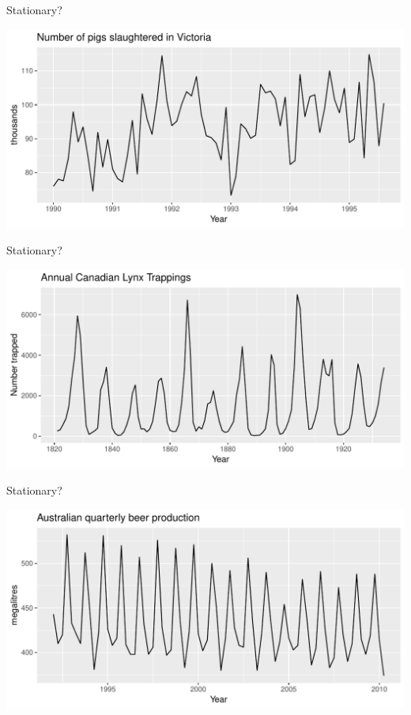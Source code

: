 \documentclass[14pt,ignorenonframetext,]{beamer}
\begin{document}
\begin{frame}{Stationary?}

\includegraphics{week_5_arima_files/figure-beamer/unnamed-chunk-6-1.pdf}

\end{frame}

\begin{frame}{Stationary?}

\includegraphics{week_5_arima_files/figure-beamer/unnamed-chunk-7-1.pdf}

\end{frame}

\begin{frame}{Stationary?}

\includegraphics{week_5_arima_files/figure-beamer/unnamed-chunk-8-1.pdf}

\end{frame}
\end{document}
